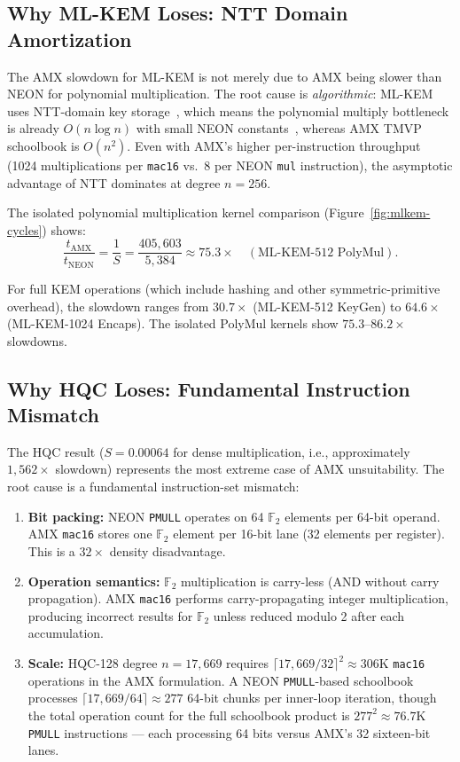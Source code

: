 \documentclass[utf8]{FrontiersinHarvard}
\begin{document}
\subsection{Why ML-KEM Loses: NTT Domain Amortization}

The AMX slowdown for ML-KEM is not merely due to AMX being slower than NEON for polynomial multiplication. The root cause is \emph{algorithmic}: ML-KEM uses NTT-domain key storage~\cite{fips203}, which means the polynomial multiply bottleneck is already $O(n \log n)$ with small NEON constants~\cite{becker2022neon}, whereas AMX TMVP schoolbook is $O(n^2)$. Even with AMX's higher per-instruction throughput (1024 multiplications per \texttt{mac16} vs.\ 8 per NEON \texttt{mul} instruction), the asymptotic advantage of NTT dominates at degree $n = 256$.

The isolated polynomial multiplication kernel comparison (Figure~\ref{fig:mlkem-cycles}) shows:
\[
  \frac{t_{\text{AMX}}}{t_{\text{NEON}}} = \frac{1}{S} = \frac{405{,}603}{5{,}384} \approx 75.3\times \quad (\text{ML-KEM-512 PolyMul}).
\]

For full KEM operations (which include hashing and other symmetric-primitive overhead), the slowdown ranges from $30.7\times$ (ML-KEM-512 KeyGen) to $64.6\times$ (ML-KEM-1024 Encaps). The isolated PolyMul kernels show $75.3$--$86.2\times$ slowdowns.

\subsection{Why HQC Loses: Fundamental Instruction Mismatch}

The HQC result ($S = 0.00064$ for dense multiplication, i.e., approximately $1{,}562\times$ slowdown) represents the most extreme case of AMX unsuitability. The root cause is a fundamental instruction-set mismatch:

\begin{enumerate}
  \item \textbf{Bit packing:} NEON \texttt{PMULL} operates on 64 $\mathbb{F}_2$ elements per 64-bit operand. AMX \texttt{mac16} stores one $\mathbb{F}_2$ element per 16-bit lane (32 elements per register). This is a $32\times$ density disadvantage.
  \item \textbf{Operation semantics:} $\mathbb{F}_2$ multiplication is carry-less (AND without carry propagation). AMX \texttt{mac16} performs carry-propagating integer multiplication, producing incorrect results for $\mathbb{F}_2$ unless reduced modulo 2 after each accumulation.
  \item \textbf{Scale:} HQC-128 degree $n = 17{,}669$ requires $\lceil 17{,}669/32 \rceil^2 \approx 306\text{K}$ \texttt{mac16} operations in the AMX formulation. A NEON \texttt{PMULL}-based schoolbook processes $\lceil 17{,}669/64 \rceil \approx 277$ 64-bit chunks per inner-loop iteration, though the total operation count for the full schoolbook product is $277^2 \approx 76.7\text{K}$ \texttt{PMULL} instructions --- each processing 64 bits versus AMX's 32 sixteen-bit lanes.
\end{enumerate}
\end{document}
